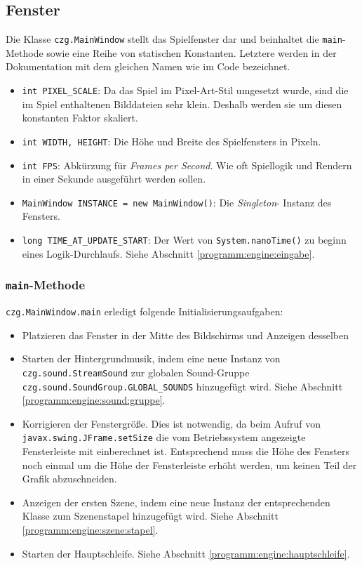 \begin{sloppypar}

\subsection{Fenster}

Die Klasse \texttt{czg.MainWindow} stellt das Spielfenster
dar und beinhaltet die \texttt{main}-Methode sowie eine
Reihe von statischen Konstanten. Letztere werden in der
Dokumentation mit dem gleichen Namen wie im Code bezeichnet.

\begin{itemize}
	\item \texttt{int PIXEL\_SCALE}: Da das Spiel im Pixel-Art-Stil
	      umgesetzt wurde, sind die im Spiel enthaltenen Bilddateien sehr
	      klein. Deshalb werden sie um diesen konstanten Faktor skaliert.
	\item \texttt{int WIDTH, HEIGHT}: Die Höhe und Breite des Spielfensters	
	      in Pixeln.
	\item \texttt{int FPS}: Abkürzung für \textit{Frames per Second}.
	      Wie oft Spiellogik und Rendern in einer Sekunde ausgeführt
	      werden sollen.
	\item \texttt{MainWindow INSTANCE = new MainWindow()}: Die \textit{Singleton}-
	      Instanz des Fensters.
	\item \texttt{long TIME\_AT\_UPDATE\_START}: Der Wert von \texttt{System.nanoTime()}
	      zu beginn eines Logik-Durchlaufs. Siehe Abschnitt \ref{programm:engine:eingabe}.
\end{itemize}


\subsubsection{\texttt{main}-Methode}

\texttt{czg.MainWindow.main} erledigt folgende Initialisierungsaufgaben:

\begin{itemize}
	\item Platzieren das Fenster in der Mitte des Bildschirms und
	      Anzeigen desselben
	\item Starten der Hintergrundmusik, indem eine neue Instanz von
	      \texttt{czg.sound.StreamSound} zur globalen Sound-Gruppe
	      \texttt{czg.sound.SoundGroup.GLOBAL\_SOUNDS} hinzugefügt wird.
	      Siehe Abschnitt \ref{programm:engine:sound:gruppe}.
	\item Korrigieren der Fenstergröße. Dies ist notwendig, da beim
	      Aufruf von \texttt{javax.swing.JFrame.setSize} die vom
	      Betriebssystem angezeigte Fensterleiste mit einberechnet
	      ist. Entsprechend muss die Höhe des Fensters noch einmal
	      um die Höhe der Fensterleiste erhöht werden, um keinen Teil
	      der Grafik abzuschneiden.
	\item Anzeigen der ersten Szene, indem eine neue Instanz der entsprechenden
	      Klasse zum Szenenstapel hinzugefügt wird. Siehe Abschnitt \ref{programm:engine:szene:stapel}.
	\item Starten der Hauptschleife. Siehe Abschnitt \ref{programm:engine:hauptschleife}.
\end{itemize}



\end{sloppypar}
